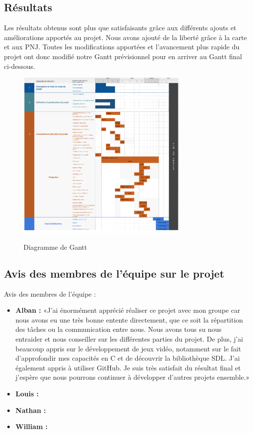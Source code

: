 \documentclass[12pt,a4paper, twoside]{article}
\begin{document}
\subsection{Résultats}
Les résultats obtenus sont plus que satisfaisants grâce aux différents ajouts et améliorations apportés au projet. Nous avons ajouté de la liberté grâce à la carte et aux PNJ. Toutes les modifications apportées et l'avancement plus rapide du projet ont donc modifié notre Gantt prévisionnel pour en arriver au Gantt final ci-dessous.
\begin{figure}[h]
    \centering
    \includegraphics[width=0.75\textwidth]{gantt finale.png}
    \label{fig:GANTT}
    \caption{Diagramme de Gantt}
\end{figure}
\subsection{Avis des membres de l'équipe sur le projet}
Avis des membres de l'équipe :
\begin{itemize}
    \item \textbf{Alban :} «J'ai énormément apprécié réaliser ce projet avec mon groupe car nous avons eu une très bonne entente directement, que ce soit la répartition des tâches ou la communication entre nous. Nous avons tous su nous entraider et nous conseiller sur les différentes parties du projet. De plus, j'ai beaucoup appris sur le développement de jeux vidéo, notamment sur le fait d'approfondir mes capacités en C et de découvrir la bibliothèque SDL. J'ai également appris à utiliser GitHub. Je suis très satisfait du résultat final et j'espère que nous pourrons continuer à développer d'autres projets ensemble.»
    \newline
    \item \textbf{Louis :}
    \newline
    \item \textbf{Nathan :}
    \newline
    \item \textbf{William :} 
    
\end{itemize}
\end{document}
